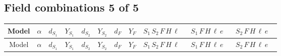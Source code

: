 \documentclass[8pt]{article}
\begin{document}
\begin{landscape}
\subsection*{Field combinations 5 of 5}
\begin{longtable}{@{}cccccccc >{\raggedright\arraybackslash}p{0.21\linewidth} >{\raggedright\arraybackslash}p{0.21\linewidth} >{\raggedright\arraybackslash}p{0.21\linewidth}@{}}
\toprule
Model & $\alpha$ & $d_{S_1}$ & $Y_{S_1}$ & $d_{S_2}$ & $Y_{S_2}$ & $d_F$ & $Y_F$ & $S_1\,S_2\,F\,H\,\ell$ & $S_1\,F\,H\,\ell\,e$ & $S_2\,F\,H\,\ell\,e$ \\
\midrule
\endfirsthead
\toprule
Model & $\alpha$ & $d_{S_1}$ & $Y_{S_1}$ & $d_{S_2}$ & $Y_{S_2}$ & $d_F$ & $Y_F$ & $S_1\,S_2\,F\,H\,\ell$ & $S_1\,F\,H\,\ell\,e$ & $S_2\,F\,H\,\ell\,e$ \\
\midrule
\endhead

\end{longtable}
\end{landscape}
\end{document}
